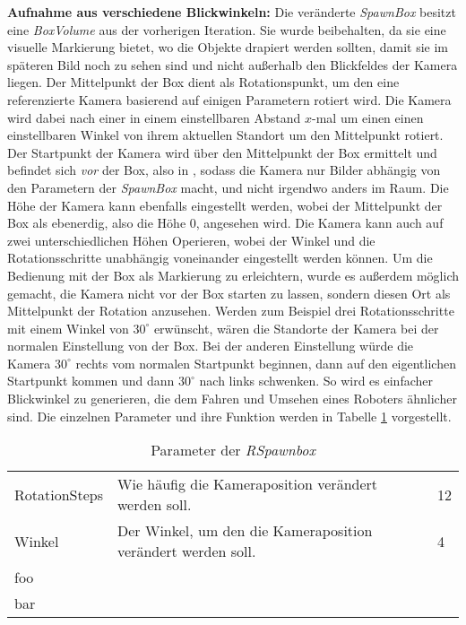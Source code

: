\textbf{Aufnahme aus verschiedene Blickwinkeln:} Die veränderte \textit{SpawnBox} besitzt eine \textit{BoxVolume} aus der vorherigen Iteration. Sie wurde beibehalten, da sie eine visuelle Markierung bietet, wo die Objekte drapiert werden sollten, damit sie im späteren Bild noch zu sehen sind und nicht außerhalb den Blickfeldes der Kamera liegen. Der Mittelpunkt der Box dient als Rotationspunkt, um den eine referenzierte Kamera basierend auf einigen Parametern rotiert wird. Die Kamera wird dabei nach einer  in einem einstellbaren Abstand $x$-mal um einen einen einstellbaren Winkel von ihrem aktuellen Standort um den Mittelpunkt rotiert. Der Startpunkt der Kamera wird über den Mittelpunkt der Box ermittelt und befindet sich \textit{vor} der Box, also in , sodass die Kamera nur Bilder abhängig von den Parametern der \textit{SpawnBox} macht, und nicht irgendwo anders im Raum. Die Höhe der Kamera kann ebenfalls eingestellt werden, wobei der Mittelpunkt der Box als ebenerdig, also die Höhe 0, angesehen wird. Die Kamera kann auch auf zwei unterschiedlichen Höhen Operieren, wobei der Winkel und die Rotationsschritte unabhängig voneinander eingestellt werden können. Um die Bedienung mit der Box als Markierung zu erleichtern, wurde es außerdem möglich gemacht, die Kamera nicht vor der Box starten zu lassen, sondern diesen Ort als Mittelpunkt der Rotation anzusehen. Werden zum Beispiel drei Rotationsschritte mit einem Winkel von $30^\circ$ erwünscht, wären die Standorte der Kamera bei der normalen Einstellung  von der Box. Bei der anderen Einstellung würde die Kamera $30^\circ$ rechts vom normalen Startpunkt beginnen, dann auf den eigentlichen Startpunkt kommen und dann $30^\circ$ nach links schwenken. So wird es einfacher Blickwinkel zu generieren, die dem Fahren und Umsehen eines Roboters ähnlicher sind. \newline
Die einzelnen Parameter und ihre Funktion werden in Tabelle \ref{tab:spawnboxParams} vorgestellt.

\begin{table}
\begin{tabular}{lll}
RotationSteps & Wie häufig die Kameraposition verändert werden soll. & 12 \\
Winkel & Der Winkel, um den die Kameraposition verändert werden soll. & 4 \\
foo &  & \\
bar &  & \\
\end{tabular}
\caption{Parameter der \textit{RSpawnbox}}
\label{tab:spawnboxParams}
\end{table}

